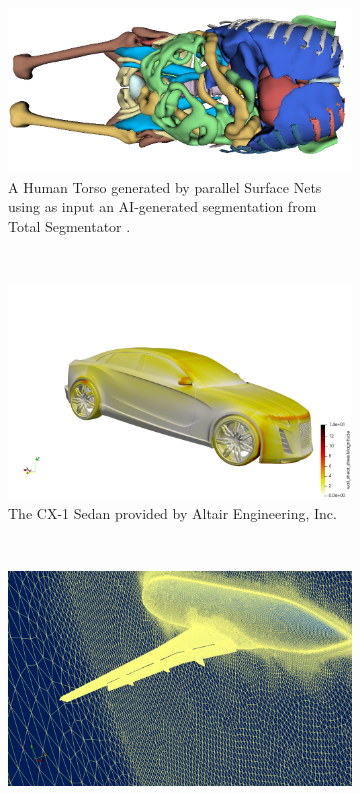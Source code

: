 \documentclass{egpubl}
\begin{document}
\begin{figure}[H]
  \centering
  \begin{subfigure}[t]{0.957\linewidth}
    \centering
    \includegraphics[width=\linewidth]{Figures/Torso.png}
    \caption{A Human Torso generated by parallel Surface Nets \cite{SurfaceNets} using as input an AI-generated segmentation from Total Segmentator \cite{TotalSegmentator}.}
  \end{subfigure}
  \\
  \begin{subfigure}[t]{0.957\linewidth}
    \centering
    \includegraphics[width=\linewidth]{Figures/CX1-car.png}
    \caption{The CX-1 Sedan provided by Altair Engineering, Inc.}
  \end{subfigure}
  \\
  \begin{subfigure}[t]{0.957\linewidth}
    \centering
    \includegraphics[width=\linewidth]{Figures/JSM.png}

\end{subfigure}
\end{figure}
\end{document}
